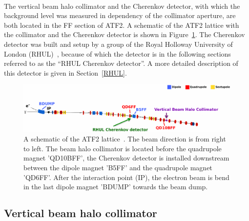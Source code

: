 \\The vertical beam halo collimator and the Cherenkov detector, with which the background level was measured in dependency of the collimator aperture, are both located in the FF section of ATF2. 
A schematic of the ATF2 lattice with the collimator and the Cherenkov detector is shown in Figure~\ref{fig:ATF2}. 
The Cherenkov detector was built and setup by a group of the Royal Holloway University of London (RHUL)~\cite{RHUL_detector_wiki}, because of which the detector is in the following sections referred to as the ``RHUL Cherenkov detector''.
A more detailed description of this detector is given in Section~\ref{RHUL}.
\begin{figure}
\centering
\includegraphics[width=\textwidth]{Figures/ATF/ATF2schematic.pdf}
\caption[ATF2 schematic]{A schematic of the ATF2 lattice~\cite{Nuria}. 
The beam direction is from right to left. 
The beam halo collimator is located before the quadrupole magnet 'QD10BFF', the Cherenkov detector is installed downstream between the dipole magnet 'B5FF' and the quadrupole magnet 'QD6FF'. 
After the interaction point (IP), the electron beam is bend in the last dipole magnet 'BDUMP' towards the beam dump. 
}
\label{fig:ATF2}
\end{figure}

\subsection{Vertical beam halo collimator}
\label{Collimator}

